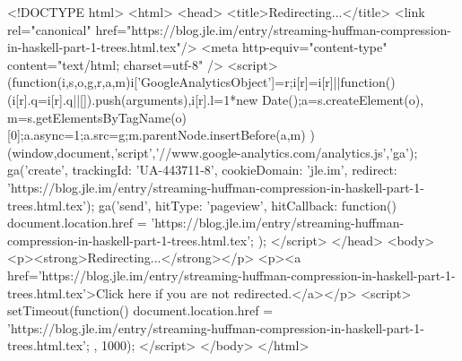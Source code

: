 <!DOCTYPE html>
<html>
<head>
<title>Redirecting...</title>
<link rel="canonical" href="https://blog.jle.im/entry/streaming-huffman-compression-in-haskell-part-1-trees.html.tex"/>
<meta http-equiv="content-type" content="text/html; charset=utf-8" />
<script>
(function(i,s,o,g,r,a,m){i['GoogleAnalyticsObject']=r;i[r]=i[r]||function(){
(i[r].q=i[r].q||[]).push(arguments)},i[r].l=1*new Date();a=s.createElement(o),
m=s.getElementsByTagName(o)[0];a.async=1;a.src=g;m.parentNode.insertBefore(a,m)
})(window,document,'script','//www.google-analytics.com/analytics.js','ga');
ga('create', { trackingId: 'UA-443711-8', cookieDomain: 'jle.im', redirect: 'https://blog.jle.im/entry/streaming-huffman-compression-in-haskell-part-1-trees.html.tex'});
ga('send', { hitType: 'pageview', hitCallback: function() { document.location.href = 'https://blog.jle.im/entry/streaming-huffman-compression-in-haskell-part-1-trees.html.tex'; } });
</script>
</head>
<body>
  <p><strong>Redirecting...</strong></p>
  <p><a href='https://blog.jle.im/entry/streaming-huffman-compression-in-haskell-part-1-trees.html.tex'>Click here if you are not redirected.</a></p>
  <script>
    setTimeout(function() { document.location.href = 'https://blog.jle.im/entry/streaming-huffman-compression-in-haskell-part-1-trees.html.tex'; }, 1000);
  </script>
</body>
</html>
